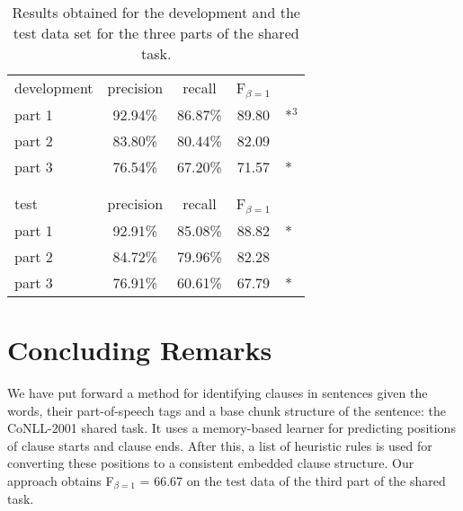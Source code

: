 \documentclass[11pt]{article}
\begin{document}
\begin{table}[t]
\begin{center}
\begin{tabular}{|l|c|c|c|l}\cline{2-4}
\multicolumn{1}{l|}{development}
                 & precision & recall & F$_{\beta=1}$ \\\cline{1-4}
part 1 & 92.94\% & 86.87\% & 89.80 & *$^3$\\
part 2 & 83.80\% & 80.44\% & 82.09 \\
part 3 & 76.54\% & 67.20\% & 71.57 & *\\\cline{1-4}
\multicolumn{4}{c}{}\\
\multicolumn{4}{c}{}\\\cline{2-4}

\multicolumn{1}{l|}{test~~~~~~}
                 & precision & recall & F$_{\beta=1}$ \\\cline{1-4}
part 1 & 92.91\% & 85.08\% & 88.82 & *\\
part 2 & 84.72\% & 79.96\% & 82.28 \\
part 3 & 76.91\% & 60.61\% & 67.79 & *\\\cline{1-4}
\end{tabular}
\end{center}
\caption{
Results obtained for the development and the test data set for the
three parts of the shared task.
} 
\label{tab-result3}
\end{table}


\section{Concluding Remarks}

We have put forward a method for identifying clauses in sentences
given the words, their part-of-speech tags and a base chunk structure
of the sentence: the CoNLL-2001 shared task.
It uses a memory-based learner for predicting positions of clause
starts and clause ends.
After this, a list of heuristic rules is used for converting these
positions to a consistent embedded clause structure.
Our approach obtains F$_{\beta=1}$ = 66.67 on the test data of the
third part of the shared task.
\end{document}
